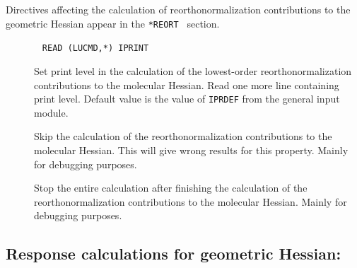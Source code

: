 Directives affecting the calculation of reorthonormalization
contributions to the geometric Hessian appear in the \verb|*REORT |
section.
\begin{description}
\item[]\verb| |\newline
\verb|READ (LUCMD,*) IPRINT|

Set print level in the calculation of the lowest-order
reorthonormalization contributions to the molecular Hessian.  Read one
more line containing print level. Default value is the value of
\verb|IPRDEF| from the general input module.

\item[] Skip the calculation of the reorthonormalization
contributions to the molecular Hessian. This will give wrong results
for this property. Mainly for debugging purposes.

\item[] Stop the entire calculation after finishing the
calculation of the reorthonormalization contributions to the molecular
Hessian. Mainly for debugging purposes.
\end{description}

\subsection{Response calculations for geometric Hessian: }
\label{sec:abares}

